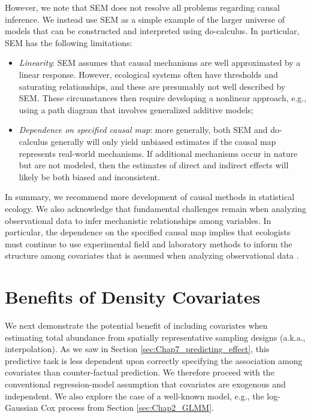 However, we note that SEM does not resolve all problems regarding causal inference.  We instead use SEM as a simple example of the larger universe of models that can be constructed and interpreted using do-calculus. In particular, SEM has the following limitations:
\begin{itemize}
    \item \textit{Linearity}:  SEM assumes that causal mechanisms are well approximated by a linear response.  However, ecological systems often have thresholds and saturating relationships, and these are presumably not well described by SEM.  These circumstances then require developing a nonlinear approach, e.g., using a path diagram that involves generalized additive models;

    \item \textit{Dependence on specified causal map}:  more generally, both SEM and do-calculus generally will only yield unbiased estimates if the causal map represents real-world mechanisms.  If additional mechanisms occur in nature but are not modeled, then the estimates of direct and indirect effects will likely be both biased and inconsistent.
\end{itemize}
In summary, we recommend more development of causal methods in statistical ecology.  We also acknowledge that fundamental challenges remain when analyzing observational data to infer mechanistic relationships among variables.  In particular, the dependence on the specified causal map implies that ecologists must continue to use experimental field and laboratory methods to inform the structure among covariates that is assumed when analyzing observational data \cite{ives_random_2022, thorson_grand_2021}.  

\section{Benefits of Density Covariates}

We next demonstrate the potential benefit of including covariates when estimating total abundance from spatially representative sampling designs (a.k.a., interpolation).  As we saw in Section \ref{sec:Chap7_predicting_effect}, this predictive task is less dependent upon correctly specifying the association among covariates than counter-factual prediction.  We therefore proceed with the conventional regression-model assumption that covariates are exogenous and independent.  We also explore the case of a well-known model, e.g., the log-Gaussian Cox process from Section \ref{sec:Chap2_GLMM}.

